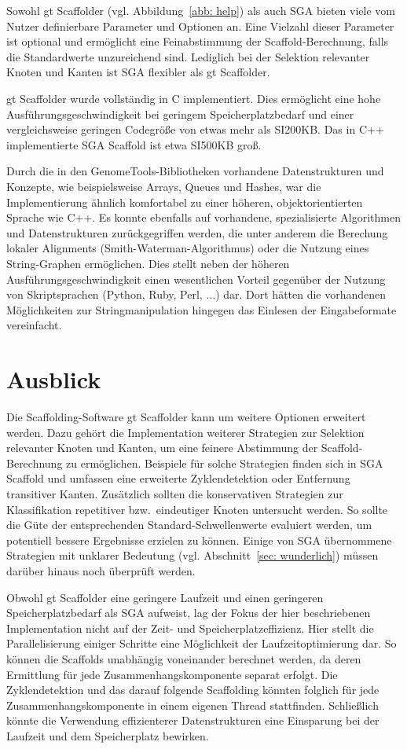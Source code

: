 \documentclass[a4paper,11pt,parskip,abstract=on]{scrartcl}
\begin{document}
Sowohl gt Scaffolder (vgl. Abbildung~\ref{abb: help}) als auch SGA
bieten viele vom Nutzer definierbare Parameter und Optionen an. Eine
Vielzahl dieser Parameter ist optional und ermöglicht eine
Feinabstimmung der Scaffold-Berechnung, falls die Standardwerte
unzureichend sind. Lediglich bei der Selektion relevanter Knoten und
Kanten ist SGA flexibler als gt Scaffolder.

gt Scaffolder wurde vollständig in C implementiert. Dies ermöglicht eine hohe
Ausführungsgeschwindigkeit bei geringem Speicherplatzbedarf und einer
vergleichsweise geringen Codegröße von etwas mehr als SI{200}{KB}. Das in C++
implementierte SGA Scaffold ist etwa SI{500}{KB} groß.

Durch die in den GenomeTools-Bibliotheken vorhandene Datenstrukturen und
Konzepte, wie beispielsweise Arrays, Queues und Hashes, war die Implementierung
ähnlich komfortabel zu einer höheren, objektorientierten Sprache wie C++. Es
konnte ebenfalls auf vorhandene, spezialisierte Algorithmen und
Datenstrukturen zurückgegriffen werden, die unter anderem die Berechung
lokaler Alignments (Smith-Waterman-Algorithmus) oder die Nutzung eines
String-Graphen ermöglichen. Dies stellt neben der höheren
Ausführungsgeschwindigkeit einen wesentlichen Vorteil gegenüber der Nutzung
von Skriptsprachen (Python, Ruby, Perl, $\ldots$) dar. Dort hätten die
vorhandenen Möglichkeiten zur Stringmanipulation hingegen das Einlesen der
Eingabeformate vereinfacht.

\section{Ausblick}
\label{sec: Ausblick}

Die Scaffolding-Software gt Scaffolder kann um weitere Optionen
erweitert werden. Dazu gehört die Implementation weiterer Strategien
zur Selektion relevanter Knoten und Kanten, um eine feinere Abstimmung
der Scaffold-Berechnung zu ermöglichen. Beispiele für solche Strategien
finden sich in SGA Scaffold und umfassen eine erweiterte
Zyklendetektion oder Entfernung transitiver Kanten.
Zusätzlich sollten die konservativen Strategien zur Klassifikation
repetitiver bzw.\ eindeutiger Knoten untersucht werden. So sollte die Güte
der entsprechenden Standard-Schwellenwerte evaluiert werden, um potentiell
bessere Ergebnisse erzielen zu können. Einige von SGA übernommene
Strategien mit unklarer Bedeutung (vgl. Abschnitt~\ref{sec: wunderlich})
müssen darüber hinaus noch überprüft werden.

Obwohl gt Scaffolder eine geringere Laufzeit und einen geringeren
Speicherplatzbedarf als SGA aufweist, lag der Fokus der hier
beschriebenen Implementation nicht auf der Zeit- und
Speicherplatzeffizienz. Hier stellt die Parallelisierung einiger
Schritte eine Möglichkeit der Laufzeitoptimierung dar. So können die
Scaffolds unabhängig voneinander berechnet werden, da deren Ermittlung
für jede Zusammenhangskomponente separat erfolgt. Die Zyklendetektion
und das darauf folgende Scaffolding könnten folglich für jede
Zusammenhangskomponente in einem eigenen Thread
stattfinden. Schließlich könnte die Verwendung effizienterer
Datenstrukturen eine Einsparung bei der Laufzeit und dem Speicherplatz
bewirken.
\end{document}
